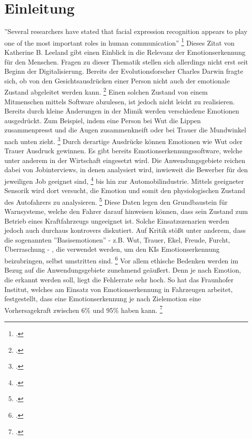 \documentclass[12pt, a4paper]{report}
\begin{document}
\chapter{Einleitung}
\pagestyle{plain}
\setcounter{page}{1}
''Several researchers have stated that facial expression recognition appears to play one of the most important roles in human communication'' 
\footcite[Vgl.][1]{FaceRec}
Dieses Zitat von Katherine B. Leeland gibt einen Einblick in die Relevanz der Emotionserkennung für den Menschen. Fragen zu dieser Thematik stellen sich allerdings nicht erst seit Beginn der Digitalisierung. Bereits der Evolutionsforscher Charles Darwin
fragte sich, ob von den Gesichtsausdrücken einer Person nicht auch der emotionale Zustand abgeleitet werden kann.
\footcite[Vgl.][2]{FaceRec}
Einen solchen Zustand von einem Mitmenschen mittels Software abzulesen, ist jedoch nicht leicht zu realisieren. Bereits durch kleine Änderungen in der Mimik werden verschiedene Emotionen ausgedrückt. Zum Beispiel, indem eine Person bei Wut die Lippen zusammenpresst und die Augen zusammenkneift oder bei Trauer die Mundwinkel nach unten zieht.
\footcite[Vgl.][249]{HandbookFaceRec}
Durch derartige Ausdrücke können Emotionen wie Wut oder Trauer Ausdruck gewinnen.
Es gibt bereits Emotionserkennungssoftware, welche unter anderem in der Wirtschaft eingesetzt wird. Die Anwendungsgebiete reichen dabei von Jobinterviews, in denen analysiert wird, inwieweit die Bewerber für den jeweiligen Job geeignet sind,
\footcite[Vgl.][]{mixedArticle}
bis hin zur Automobilindustrie. Mittels geeigneter Sensorik wird dort versucht, die Emotion und somit den physiologischen Zustand des Autofahrers zu analysieren.
\footcite[Vgl.][Herausforderung]{Frauenhofer}
Diese Daten legen den Grundbaustein für Warnsysteme, welche den Fahrer darauf hinweisen können, dass sein Zustand zum Betrieb eines Kraftfahrzeugs ungeeignet ist. Solche Einsatzszenarien werden jedoch auch durchaus kontrovers diskutiert. Auf Kritik stößt unter anderem, dass die sogenannten ''Basisemotionen'' - z.B. Wut, Trauer, Ekel, Freude, Furcht, Überraschung - , die verwendet werden, um den KIs Emotionserkennung beizubringen, selbst umstritten sind.
\footcite[Vgl.][]{SZ}
Vor allem ethische Bedenken werden im Bezug auf die Anwendungsgebiete zunehmend geäußert. Denn je nach Emotion, die erkannt werden soll, liegt die Fehlerrate sehr hoch. So hat das Fraunhofer Institut, welches am Einsatz von Emotionserkennung in Fahrzeugen arbeitet, festgestellt, dass eine Emotionserkennung je nach Zielemotion eine Vorhersagekraft zwischen 6\% und 95\% haben kann.
\footcite[Vgl.][Ergebnis]{Frauenhofer}
\end{document}
